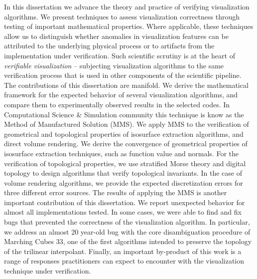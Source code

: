 
In this dissertation we advance the theory and practice of verifying visualization algorithms.
%
We present techniques to assess visualization correctness  through testing of important mathematical properties. Where applicable, these techniques allow us to distinguish
 whether anomalies in visualization features can be attributed to the
  underlying physical process or to artifacts from the implementation under verification.
Such scientific scrutiny is at the heart of {\em
    verifiable visualization} -- subjecting visualization algorithms
  to the same verification process that is used in other components of
  the scientific pipeline.  The contributions of this dissertation are manifold. We derive the mathematical framework for
  the expected behavior of several 
  visualization algorithms,
  and compare them to experimentally observed results in the selected
  codes.  In Computational Science \& Simulation community this technique is know as the Method of Manufactured Solution (MMS). We apply MMS to the verification of geometrical and topological properties of isosurface extraction algorithms, and direct volume rendering. 
We derive the convergence of geometrical properties of isosurface extraction techniques, such as function value and normals. For the verification of topological properties, we use stratified Morse theory and digital topology to
design algorithms that verify topological invariants. In the case of volume rendering algorithms, we provide the expected discretization errors for three different error sources.
The results of applying the MMS is another important contribution of this dissertation. 
%
We report unexpected behavior for almost all implementations tested. In some cases, we were able to find and fix bugs that prevented the correctness of the visualization algorithm. 
%
In particular,  we address an almost 20 year-old bug with the core disambiguation procedure of  Marching Cubes 33, one of the first algorithms intended to preserve the topology of the trilinear interpolant. 
%
Finally,  an important by-product of this work is a range of responses practitioners can expect to encounter with the visualization technique under verification. 
  